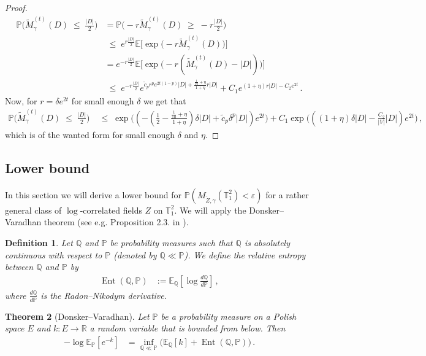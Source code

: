 \documentclass[11pt]{article}
\numberwithin{equation}{section}
\newtheorem{theorem}{Theorem}[section]
\newtheorem{definition}[theorem]{Definition}
\theoremstyle{definition}
\renewcommand{\tilde}{\widetilde}          %
\renewcommand{\leq}{\;\leqslant\;}                   %
\renewcommand{\geq}{\;\geqslant\;}                   %
\newcommand{\R}{\mathbb{R}}
\newcommand{\Q}{\mathbb{Q}}
\newcommand{\E}{\mathbb{E}}
\renewcommand{\P}{\mathbb{P}}
\def\eps{\varepsilon}
\def\T{\mathbb{T}}
\newcommand{\ab}{|}
\newcommand{\Pb}{\P}
\newcommand{\opn}{\operatorname}
\newcommand{\tor}{{\T_1^2}}
\begin{document}
\begin{proof}
\begin{align*}
\P\big( \tilde M_{\gamma}^{(t)}(D) \leq \tfrac{\ab D \ab}{2} \big) &= \P\big( -r \tilde M_{\gamma}^{(t)}(D) \geq  -r \tfrac{\ab D \ab}{2} \big) \\
&\leq e^{r \frac{\ab D \ab }{2}} \E \big[ \exp \big( -r \tilde M_{\gamma}^{(t)}(D)   \big) \big ] \\
&= e^{- r \frac{\ab D \ab }{2}} \E \big[ \exp \big( -r (\tilde M_{\gamma}^{(t)}(D)   - \ab D \ab ) \big) \big] \\
& \leq e^{- r \frac{\ab D \ab }{2}} e^{\tilde c_p r^p e^{2t(1-p)} |D| + \frac{\frac{1}{10} + \eta }{1 + \eta}  r \ab D \ab } + C_1 e^{(1+\eta)r \ab D \ab - C_2 e^{2t}}\,.
\end{align*}
Now, for $r = \delta e^{2t}$ for small enough $\delta$ we get that
\begin{align*}
\P\big( \tilde M_{\gamma}^{(t)}(D) \leq \tfrac{\ab D \ab}{2} \big) &\leq \exp \big( (- (\tfrac{1}{2} - \tfrac{\frac{1}{10} + \eta }{1 + \eta}) \delta \ab D \ab   + \tilde c_p \delta^p |D|  ) e^{2t} \big) + C_1 \exp \big( ( (1+\eta)\delta  \ab D \ab - \tfrac{C_2}{|V|} |D|) e^{2t} \big)\,,
\end{align*}
which is of the wanted form for small enough $\delta$ and $\eta$.

\end{proof}

\subsection{Lower bound}


In this section we will derive a lower bound for $\P(M_{\tilde Z,\gamma}(\tor) < \eps)$ for a rather general class of $\log$-correlated fields $Z$ on $\tor$. We will apply the Donsker--Varadhan theorem (see e.g. Proposition 2.3. in \cite{BuDu}).
	\begin{definition}
	Let $\Q$ and $\P$ be probability measures such that $\Q$ is absolutely continuous with respect to $\P$ (denoted by $\Q \ll \P$). We define the relative entropy between $\Q$ and $\P$ by
	\begin{align*}
	\opn{Ent}(\Q,\P) &:= \E_\Q[\log \frac{d\Q}{d\P} ]\,,
	\end{align*}
	where $\frac{d\Q}{d\P}$ is the Radon--Nikodym derivative.
	\end{definition}  
  
  \begin{theorem}[Donsker--Varadhan]\label{thm:donsker}
	Let $\Pb$ be a probability measure on a Polish space $E$ and $k: E \to \R$ a random variable that is bounded from below. Then 
	\begin{align*}
	- \log \E_\Pb[e^{-k}] &= \inf_{\mathbb{Q} \ll \Pb } \big( \E_{\mathbb{Q}}[k] + \opn{Ent}(\mathbb{Q},\mathbb{P}) \big)\,.
	\end{align*}
  \end{theorem}
  
\end{document}
